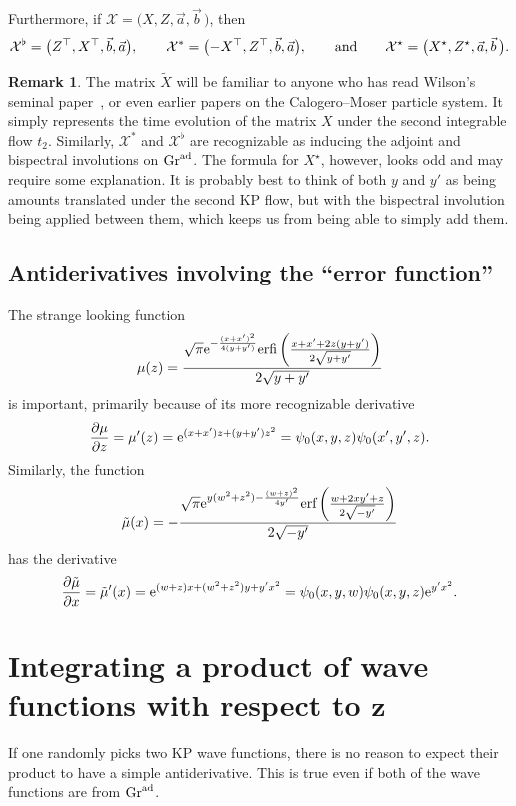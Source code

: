 \documentclass[pdftex]{sigma}
\numberwithin{equation}{section}
\theoremstyle{definition}
\newtheorem{Remark}[Theorem]{Remark}
\def\X{\mathcal{X}}
\begin{document}
Furthermore, if $\X=\bigl(X,Z,\vec a,\vec b\,\bigr)$, then
 \[
\X^{\flat}=\bigl(Z^{\top},X^{\top},\vec b,\vec a\bigr),\qquad
\X^*=\bigl(-X^{\top},Z^{\top},\vec b,\vec a\bigr),\qquad\hbox{and}\qquad
\X^\star=\bigl(X^\star,Z^\star,\vec a,\vec b\,\bigr).
 \]

 \begin{Remark}
 The matrix $\tilde X$ will be familiar to anyone who has read
 Wilson's seminal paper~\cite{WilsonCM}, or even earlier papers on
 the Calogero--Moser particle system. It simply represents the time
 evolution of the matrix $X$ under the second integrable flow
 $t_2$. Similarly, $\X^*$ and $\X^{\flat}$ are recognizable as inducing the
adjoint and bispectral involutions on ${\rm Gr}^{\rm ad}$.
The formula for $X^\star$, however, looks odd and may require some explanation. It is
 probably best to think of both $y$ and $y'$ as being amounts translated
 under the second KP flow, but with the bispectral involution being
 applied between them, which keeps us from being able to simply add
 them.
 \end{Remark}


\subsection{Antiderivatives involving the ``error function''}\label{sec:mu}
The strange looking function
\[
 \mu(z)=\frac{\sqrt{\pi }
 {\rm e}^{-\frac{(x+x')^2}{4
 (y+y')}}
 \text{erfi}\left(\frac{x+x'+2 z (y+y')}{2
 \sqrt{y+y'}}\right)}{2
 \sqrt{y+y'}}
 \]
is important, primarily because of its more recognizable derivative
 \[ \frac{\partial\mu}{\partial z}=\mu'(z)
={\rm e}^{(x+x')z+(y+y')z^2}=\psi_0(x,y,z)\psi_0(x',y',z).
 \]
Similarly, the function
\[
\tilde\mu(x)=-\frac{\sqrt{\pi } {\rm e}^{y (w^2+z^2)-\frac{(w+z)^2}{4 y'}}
 \text{erf}\left(\frac{w+2 x y'+z}{2
 \sqrt{-y'}}\right)}{2 \sqrt{-y'}}
 \]
has the derivative
\[
\frac{\partial\tilde\mu}{\partial x}=\tilde\mu'(x)={\rm e}^{(w+z)x+(w^2+z^2)y+y'x^2}=\psi_0(x,y,w)\psi_0(x,y,z){\rm e}^{y'x^2}.
\]

\section[Integrating a product of wave functions with respect to z]{Integrating a product of wave functions with respect to $\boldsymbol{z}$}
If one randomly picks two KP wave functions, there is no reason to
expect their product to have a simple antiderivative. This is true
even if both of the wave functions are from ${\rm Gr}^{\rm ad}$.
\end{document}
